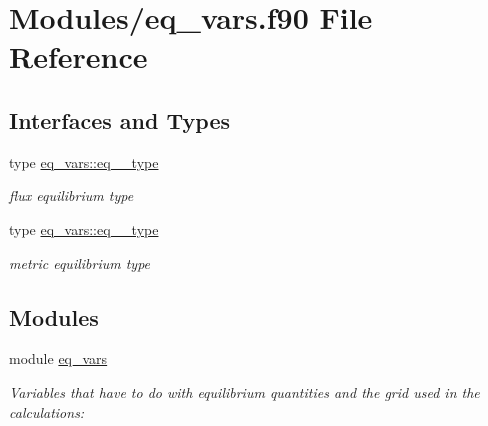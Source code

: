 \hypertarget{eq__vars_8f90}{}\section{Modules/eq\+\_\+vars.f90 File Reference}
\label{eq__vars_8f90}
\subsection*{Interfaces and Types}
\begin{DoxyCompactItemize}
\item 
type \hyperlink{structeq__vars_1_1eq__1__type}{eq\+\_\+vars\+::eq\+\_\+\_\+type}
\begin{DoxyCompactList}\small\item\em flux equilibrium type \end{DoxyCompactList}\item 
type \hyperlink{structeq__vars_1_1eq__2__type}{eq\+\_\+vars\+::eq\+\_\+\_\+type}
\begin{DoxyCompactList}\small\item\em metric equilibrium type \end{DoxyCompactList}\end{DoxyCompactItemize}
\subsection*{Modules}
\begin{DoxyCompactItemize}
\item 
module \hyperlink{namespaceeq__vars}{eq\+\_\+vars}
\begin{DoxyCompactList}\small\item\em Variables that have to do with equilibrium quantities and the grid used in the calculations\+: \end{DoxyCompactList}\end{DoxyCompactItemize}
